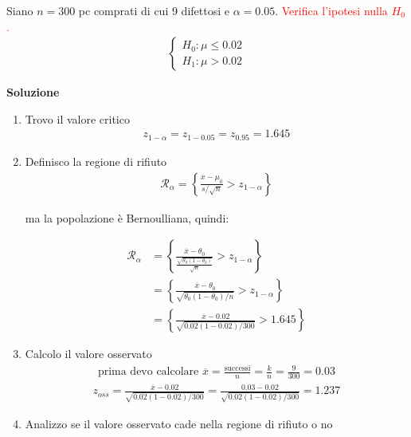 \documentclass{article}  %
\theoremstyle{definition}
\begin{document}
\begin{esercizio}
	Siano $n=300$ pc comprati di cui 9 difettosi e $\alpha=0.05$. \textcolor{red}{Verifica l'ipotesi nulla $H_0$.}
	\begin{align*}
		\begin{cases}
			H_0: \mu \leq 0.02 \\
			H_1: \mu > 0.02
		\end{cases}
	\end{align*}
	\begin{center}
		\textbf{Soluzione}
	\end{center}
	\begin{enumerate}
		\item Trovo il valore critico
		\begin{align*}
			z_{1-\alpha}=z_{1-0.05}=z_{0.95}=1.645
		\end{align*}
		\item Definisco la regione di rifiuto
		\begin{align*}
			 \mathcal{R}_{\alpha}=\left\{\frac{\overline{x}-\mu_0}{s/\sqrt{n}} > z_{1-\alpha} \right\}
		\end{align*}
		\begin{center}
			ma la popolazione è Bernoulliana, quindi:
		\end{center}
		\begin{align*}
			 \mathcal{R}_{\alpha}&=\left\{\frac{\overline{x}-\theta_0}{\frac{\sqrt{\theta_0(1-\theta_0)}}{\sqrt{n}}} > z_{1-\alpha} \right\} \\ 
			 &= \left\{\frac{\overline{x}-\theta_0}{\sqrt{\theta_0(1-\theta_0)/n}} > z_{1-\alpha} \right\} \\
			 &= \left\{\frac{\overline{x}-0.02}{\sqrt{0.02(1-0.02)/300}} > 1.645 \right\}
		\end{align*}
		\item Calcolo il valore osservato
		\begin{align*}
			\text{prima devo calcolare } \overline{x}=\frac{\text{successi}}{n}=\frac{k}{n}=\frac{9}{300}=0.03
		\end{align*}
		\begin{align*}
			z_{oss}= \frac{\overline{x}-0.02}{\sqrt{0.02(1-0.02)/300}} = \frac{0.03-0.02}{\sqrt{0.02(1-0.02)/300}} = 1.237
		\end{align*}
		\item Analizzo se il valore osservato cade nella regione di rifiuto o no
		\begin{align*}

\end{align*}
\end{enumerate}
\end{esercizio}
\end{document}

